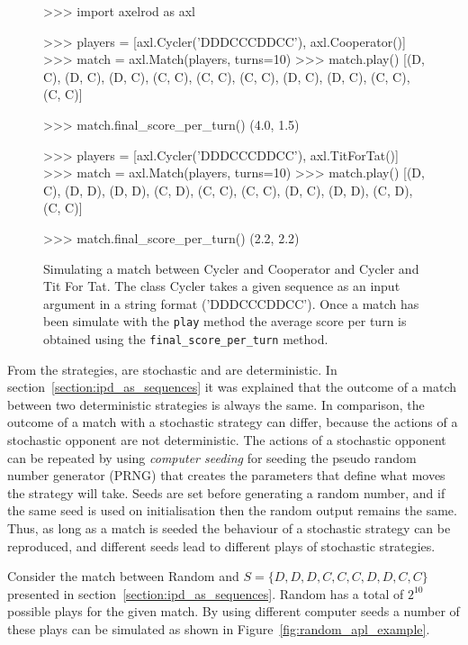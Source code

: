 \begin{figure}[!htbp]
    \begin{usagepy}
>>> import axelrod as axl

>>> players = [axl.Cycler('DDDCCCDDCC'), axl.Cooperator()]
>>> match = axl.Match(players, turns=10)
>>> match.play()
[(D, C), (D, C), (D, C), (C, C), (C, C), (C, C), (D, C), (D, C), (C, C), (C, C)]

>>> match.final_score_per_turn()
(4.0, 1.5)

>>> players = [axl.Cycler('DDDCCCDDCC'), axl.TitForTat()]
>>> match = axl.Match(players, turns=10)
>>> match.play()
[(D, C), (D, D), (D, D), (C, D), (C, C), (C, C), (D, C), (D, D), (C, D), (C, C)]

>>> match.final_score_per_turn()
(2.2, 2.2)

\end{usagepy}
\caption{Simulating a match between Cycler and Cooperator and Cycler and Tit For Tat.
The class Cycler takes a given sequence as an input argument in a string format
('DDDCCCDDCC'). Once a match has been simulate with the \texttt{play} method
the average score per turn is obtained using the \texttt{final_score_per_turn}
method.}\label{fig:apl_simulations_cycler}
\end{figure}

From the \numberofstrategiesbestsequences strategies, \stochasticstrategies are stochastic and
\deterministicstrategies are deterministic. In section~\ref{section:ipd_as_sequences} it was explained
that the outcome of a match between two deterministic strategies is always the same.
In comparison, the outcome of a match with a stochastic strategy can
differ, because the actions of a stochastic opponent are not deterministic.
The actions of a stochastic opponent can be repeated by using
\textit{computer seeding} for seeding the pseudo random number generator (PRNG) that creates the
parameters that define what moves the strategy will take. Seeds are set before
generating a random number, and if the same seed is used on initialisation then
the random output remains the same. Thus, as long as a match is seeded the
behaviour of a stochastic strategy can be reproduced, and different seeds lead
to different plays of stochastic strategies.

Consider the match between Random and \(S = \{D, D, D, C, C, C, D, D, C, C\}\)
presented in section~\ref{section:ipd_as_sequences}. Random has a total of
\(2^{10}\) possible plays for the given match. By using different computer seeds a number of these
plays can be simulated as shown in Figure~\ref{fig:random_apl_example}.

